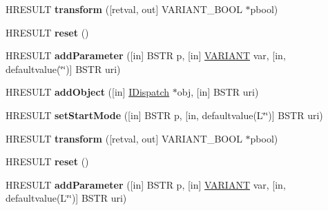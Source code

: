 \begin{DoxyCompactItemize}
H\+R\+E\+S\+U\+LT {\bfseries transform} (\mbox{[}retval, out\mbox{]} V\+A\+R\+I\+A\+N\+T\+\_\+\+B\+O\+OL $\ast$pbool)
\item 
\mbox{\label{interface_m_s_x_m_l2_1_1_i_x_s_l_processor_a501afc385ac4ef4db427904db8bb861b}} 
H\+R\+E\+S\+U\+LT {\bfseries reset} ()
\item 
\mbox{\label{interface_m_s_x_m_l2_1_1_i_x_s_l_processor_a5ad9e9ace775c372867e3938a93a06b6}} 
H\+R\+E\+S\+U\+LT {\bfseries add\+Parameter} (\mbox{[}in\mbox{]} B\+S\+TR p, \mbox{[}in\mbox{]} \hyperlink{structtag_v_a_r_i_a_n_t}{V\+A\+R\+I\+A\+NT} var, \mbox{[}in, defaultvalue(\char`\"{}\char`\"{})\mbox{]} B\+S\+TR uri)
\item 
\mbox{\label{interface_m_s_x_m_l2_1_1_i_x_s_l_processor_a8fb859ac26ce214368826b25bbe93def}} 
H\+R\+E\+S\+U\+LT {\bfseries add\+Object} (\mbox{[}in\mbox{]} \hyperlink{interface_i_dispatch}{I\+Dispatch} $\ast$obj, \mbox{[}in\mbox{]} B\+S\+TR uri)
\item 
\mbox{\label{interface_m_s_x_m_l2_1_1_i_x_s_l_processor_aa4fec9cd387b7e0c8112d0053449f192}} 
H\+R\+E\+S\+U\+LT {\bfseries set\+Start\+Mode} (\mbox{[}in\mbox{]} B\+S\+TR p, \mbox{[}in, defaultvalue(L\char`\"{}\char`\"{})\mbox{]} B\+S\+TR uri)
\item 
\mbox{\label{interface_m_s_x_m_l2_1_1_i_x_s_l_processor_acfb60471c931018529e7f178850fb673}} 
H\+R\+E\+S\+U\+LT {\bfseries transform} (\mbox{[}retval, out\mbox{]} V\+A\+R\+I\+A\+N\+T\+\_\+\+B\+O\+OL $\ast$pbool)
\item 
\mbox{\label{interface_m_s_x_m_l2_1_1_i_x_s_l_processor_a501afc385ac4ef4db427904db8bb861b}} 
H\+R\+E\+S\+U\+LT {\bfseries reset} ()
\item 
\mbox{\label{interface_m_s_x_m_l2_1_1_i_x_s_l_processor_a4122e4f77ca43e1e76c872cf0941a462}} 
H\+R\+E\+S\+U\+LT {\bfseries add\+Parameter} (\mbox{[}in\mbox{]} B\+S\+TR p, \mbox{[}in\mbox{]} \hyperlink{structtag_v_a_r_i_a_n_t}{V\+A\+R\+I\+A\+NT} var, \mbox{[}in, defaultvalue(L\char`\"{}\char`\"{})\mbox{]} B\+S\+TR uri)

\end{DoxyCompactItemize}
